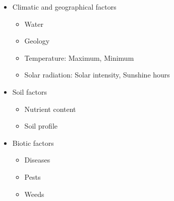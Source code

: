 \documentclass[11pt,dvipsnames,ignorenonframetext,aspectratio=169]{beamer}
\providecommand{\tightlist}{%
  \setlength{\itemsep}{0pt}\setlength{\parskip}{0pt}}
\begin{document}
\begin{frame}{}
\protect\hypertarget{section-3}{}

\begin{itemize}
\tightlist
\item
  Climatic and geographical factors

  \begin{itemize}
  \tightlist
  \item
    Water
  \item
    Geology
  \item
    Temperature: Maximum, Minimum
  \item
    Solar radiation: Solar intensity, Sunshine hours
  \end{itemize}
\item
  Soil factors

  \begin{itemize}
  \tightlist
  \item
    Nutrient content
  \item
    Soil profile
  \end{itemize}
\item
  Biotic factors

  \begin{itemize}
  \tightlist
  \item
    Diseases
  \item
    Pests
  \item
    Weeds
  \end{itemize}
\end{itemize}

\end{frame}
\end{document}
